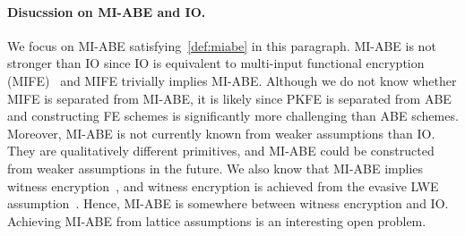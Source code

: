 \paragraph{Disucssion on MI-ABE and IO.}
We focus on MI-ABE satisfying~\cref{def:miabe} in this paragraph.
MI-ABE is not stronger than IO since IO is equivalent to multi-input functional encryption (MIFE)~\cite{EC:GGGJKL14} and MIFE trivially implies MI-ABE.
Although we do not know whether MIFE is separated from MI-ABE, it is likely since PKFE is separated from ABE~\cite{C:GarMahMoh17} and constructing FE schemes is significantly more challenging than ABE schemes.
Moreover, MI-ABE is not currently known from weaker assumptions than IO.
They are qualitatively different primitives, and MI-ABE could be constructed from weaker assumptions in the future.
We also know that MI-ABE implies witness encryption~\cite{SCN:BJKPW18}, and witness encryption is achieved from the evasive LWE assumption~\cite{C:Tsabary22,AC:VaiWeeWic22}.
Hence, MI-ABE is somewhere between witness encryption and IO.
Achieving MI-ABE from lattice assumptions is an interesting open problem.




%
%

